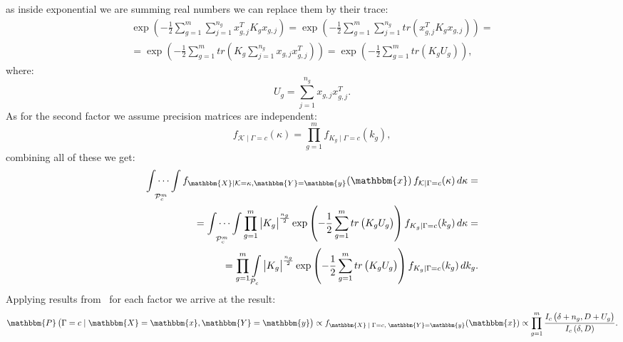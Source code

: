 \documentclass[a4paper,11pt,twoside]{report}
\theoremstyle{definition}
\begin{document}
as inside exponential we are summing real numbers we can replace them by their trace:
\begin{equation}
    \begin{align}
        \exp\left(-\frac{1}{2}\sum_{g=1}^m\sum_{j=1}^{n_g}
        x_{g,j}^T K_g x_{g,j}\right) = \exp\left(-\frac{1}{2}\sum_{g=1}^m\sum_{j=1}^{n_g}
        tr\left(x_{g,j}^T K_g x_{g,j}\right)\right) = \\ =
        \exp\left(-\frac{1}{2}\sum_{g=1}^mtr\left(K_g\sum_{j=1}^{n_g}
        x_{g,j}x_{g,j}^T\right)\right) = \exp\left(-\frac{1}{2}\sum_{g=1}^mtr\left(K_{g}U_g\right)\right),
    \end{align}
\end{equation}
where:
\begin{equation}
    U_g = \sum_{j=1}^{n_g}
        x_{g,j}x_{g,j}^T.
\end{equation}
As for the second factor we assume precision matrices are independent:
\begin{equation}
    f_{\mathcal{K} \mid \Gamma = c}(\kappa) = \prod_{g=1}^m f_{K_g \mid \Gamma = c} (k_g),
\end{equation}
combining all of these we get:
\begin{equation}
    \begin{align}
        \idotsint\limits_{\mathcal{P}_c^m}
    f_{\mathbbm{X} \mid \mathcal{K} = \kappa, \mathbbm{Y} = \mathbbm{y}}(\mathbbm{x})\,
    f_{\mathcal{K} \mid \Gamma = c}(\kappa)
    \, d \kappa = \\ =\idotsint\limits_{\mathcal{P}_c^m} \prod_{g=1}^m \left|K_g\right|^{\frac{n_g}{2}}
        \exp\left(-\frac{1}{2}\sum_{g=1}^mtr\left(K_{g}U_g\right)\right) f_{K_g \mid \Gamma = c}(k_g) \, d \kappa = \\ =
        \prod_{g=1} ^m \int\limits_{\mathcal{P}_c} \left|K_g\right|^{\frac{n_g}{2}}
        \exp\left(-\frac{1}{2}\sum_{g=1}^mtr\left(K_{g}U_g\right)\right) f_{K_g \mid \Gamma = c}(k_g) \, dk_g.
    \end{align}
\end{equation}
Applying results from~\cite{JSSv112i07} for each factor we arrive at the result:
\begin{equation}\label{UltimateAPosterioriFormula}
    \mathbbm{P}\left(\Gamma = c \mid \mathbbm{X} = \mathbbm{x}, \mathbbm{Y} = \mathbbm{y}\right) \propto
    f_{\mathbbm{X} \; \mid \; \Gamma = c, \; \mathbbm{Y} = \mathbbm{y}}(\mathbbm{x}) \propto
    \prod_{g=1}^m\frac{I_c\left(\delta + n_g, D+U_g\right)}{I_c\left(\delta, D\right)}.
\end{equation}
\end{document}

